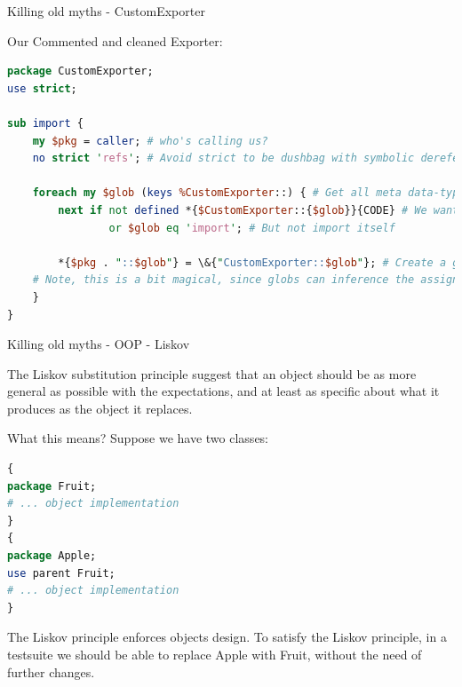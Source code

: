 \documentclass[10pt]{beamer}
\begin{document}
\begin{frame}[fragile]{Killing old myths - CustomExporter}

Our Commented and cleaned Exporter:
\begin{lstlisting}[language=perl]
package CustomExporter;
use strict;

sub import {
    my $pkg = caller; # who's calling us?
    no strict 'refs'; # Avoid strict to be dushbag with symbolic dereference
    
    foreach my $glob (keys %CustomExporter::) { # Get all meta data-types in the package
        next if not defined *{$CustomExporter::{$glob}}{CODE} # We want to put in caller only functions
                or $glob eq 'import'; # But not import itself

        *{$pkg . "::$glob"} = \&{"CustomExporter::$glob"}; # Create a glob for the package.
	# Note, this is a bit magical, since globs can inference the assigned type.
    }
}
\end{lstlisting}

\pause


\end{frame}



\begin{frame}[fragile]{Killing old myths - OOP - Liskov}

The Liskov substitution principle suggest that an object should be as more general as possible with the expectations, and at least as specific about what it produces as the object it replaces.

What this means? 
Suppose we have two classes:
\begin{lstlisting}[language=perl]
{
package Fruit;
# ... object implementation
}
{
package Apple;
use parent Fruit;
# ... object implementation
}
\end{lstlisting}
The Liskov principle enforces objects design. To satisfy the Liskov principle, in a testsuite we should be able to replace Apple with Fruit, without the need of further changes.

\end{frame}
\end{document}
